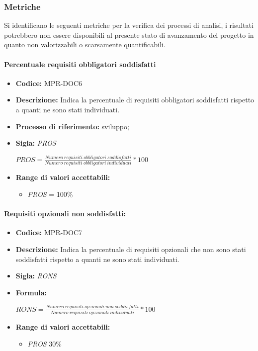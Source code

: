 \subsubsection{Metriche}

Si identificano le seguenti metriche per la verifica dei processi di analisi, i risultati potrebbero non essere disponibili al presente stato di avanzamento del progetto
in quanto non valorizzabili o scarsamente quantificabili.


\paragraph{Percentuale requisiti obbligatori soddisfatti}
    
 \begin{itemize}
    \item \textbf{Codice:} MPR-DOC6
    \item \textbf{Descrizione:} Indica la percentuale di requisiti obbligatori soddisfatti rispetto a quanti ne sono stati individuati.
    \item \textbf{Processo di riferimento:} sviluppo;
    \item \textbf{Sigla:} \textit{PROS}
  
    
    \begin{center}
        \(PROS = \frac{Numero\ requisiti\ obbligatori\ soddisfatti}{Numero\ requisiti\  obbligatori\ individuati}*100\)
    \end{center}

    \item \textbf{Range di valori accettabili:}
    \begin{itemize}
        \item  \textit{PROS} = 100\%
    \end{itemize}
\end{itemize}
    
  
\paragraph{Requisiti opzionali non soddisfatti:}
  \begin{itemize}
    \item \textbf{Codice:} MPR-DOC7
    \item \textbf{Descrizione:} Indica la percentuale di requisiti opzionali che non sono stati soddisfatti rispetto a quanti ne sono stati individuati.
    \item \textbf{Sigla:} \textit{RONS}
    \item \textbf{Formula:}
    \begin{center}
        \(RONS=\frac{Numero\ requisiti\ opzionali\ non\ soddisfatti}{Numero\ requisiti\  opzionali\ individuati}*100\)
    \end{center}
    \item \textbf{Range di valori accettabili:}
    \begin{itemize}
        \item \textit{PROS} 30\%
    
    \end{itemize}
\end{itemize}


